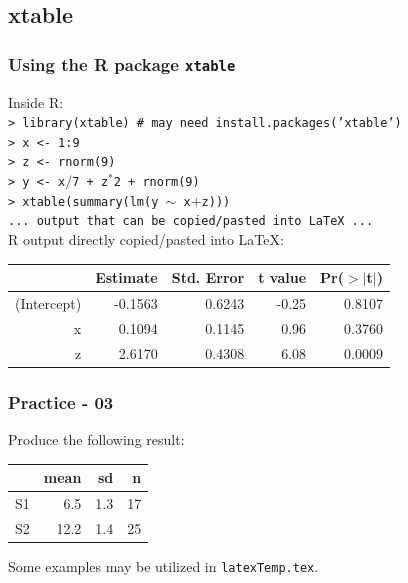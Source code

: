 \documentclass[slidestop,compress,mathserif]{beamer}
\begin{document}
\subsection[xtable]{xtable}
\begin{frame} \frametitle{Using the R package \texttt{xtable}} 
	Inside R: \\
	\vspace{0.3cm} \small
	\hspace{0.3cm}\texttt{> library(xtable) \# may need install.packages('xtable')} \\
	\hspace{0.3cm}\texttt{> x <- 1:9} \\
	\hspace{0.3cm}\texttt{> z <- rnorm(9)} \\
	\hspace{0.3cm}\texttt{> y <- x$/$7 + z$^*$2 + rnorm(9)} \\
	\hspace{0.3cm}\texttt{> xtable(summary(lm(y $\sim$ x$+$z)))} \\
	\hspace{0.3cm}\texttt{... output that can be copied/pasted into LaTeX ...} \\
	\vspace{0.3cm} \normalsize
	R output directly copied/pasted into LaTeX:
	\begin{table}[ht]
		\begin{center}
			\begin{tabular}{rrrrr}
				\hline
				& Estimate & Std. Error & t value & Pr($>$$|$t$|$) \\
				\hline
				(Intercept) & -0.1563 & 0.6243 & -0.25 & 0.8107 \\
				x & 0.1094 & 0.1145 & 0.96 & 0.3760 \\
				z & 2.6170 & 0.4308 & 6.08 & 0.0009 \\
				\hline
			\end{tabular}
		\end{center}
	\end{table}
\end{frame}

\begin{frame} \frametitle{Practice - 03}
	
	Produce the following result:
	\begin{center}
		\begin{tabular}{l rrr}
			\hline
			& mean & sd & n \\
			\hline
			S1 & 6.5 & 1.3 & 17 \\
			S2 & 12.2 & 1.4 & 25 \\
			\hline
		\end{tabular}
	\end{center}
	
	Some examples may be utilized in \texttt{\color{highlight}latexTemp.tex}.
	
\end{frame}
\end{document}
